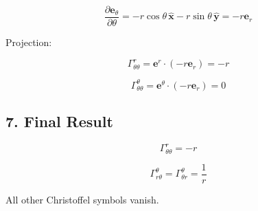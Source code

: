\documentclass{article}
\begin{document}
	\[
	\frac{\partial \mathbf{e}_\theta}{\partial \theta}
	=
	-r\cos\theta\,\hat{\mathbf{x}} - r\sin\theta\,\hat{\mathbf{y}}
	= -r \mathbf{e}_r
	\]
	
	Projection:
	
	\[
	\Gamma^r_{\theta\theta}
	=
	\mathbf{e}^r \cdot (-r\mathbf{e}_r)
	= -r
	\]
	
	\[
	\Gamma^\theta_{\theta\theta}
	=
	\mathbf{e}^\theta \cdot (-r\mathbf{e}_r)
	= 0
	\]
	
	\subsection*{7. Final Result}
	
	\[
	\Gamma^r_{\theta\theta} = -r
	\]
	
	\[
	\Gamma^\theta_{r\theta}
	=
	\Gamma^\theta_{\theta r}
	= \frac{1}{r}
	\]
	
	All other Christoffel symbols vanish.
	
\end{document}
